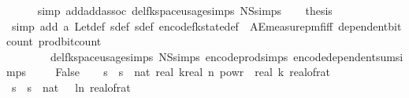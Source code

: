 \begin{isabellebody}
\ \ \ \ \isamarkupfalse%
\ {\isacharparenleft}{\kern0pt}simp\ add{\isacharcolon}{\kern0pt}add{\isachardot}{\kern0pt}assoc\ del{\isacharcolon}{\kern0pt}fk{\isacharunderscore}{\kern0pt}space{\isacharunderscore}{\kern0pt}usage{\isachardot}{\kern0pt}simps\ N\isactrlsub S{\isachardot}{\kern0pt}simps{\isacharparenright}{\kern0pt}\isanewline
\ \ \isamarkupfalse%
\ {\isacharquery}{\kern0pt}thesis\ \isanewline
\ \ \ \ \isamarkupfalse%
\ {\isacharparenleft}{\kern0pt}simp\ add{\isacharcolon}{\kern0pt}\ a\ Let{\isacharunderscore}{\kern0pt}def\ sdef\ sdef\ encode{\isacharunderscore}{\kern0pt}fk{\isacharunderscore}{\kern0pt}state{\isacharunderscore}{\kern0pt}def\ \ AE{\isacharunderscore}{\kern0pt}measure{\isacharunderscore}{\kern0pt}pmf{\isacharunderscore}{\kern0pt}iff\ dependent{\isacharunderscore}{\kern0pt}bit{\isacharunderscore}{\kern0pt}count\ prod{\isacharunderscore}{\kern0pt}bit{\isacharunderscore}{\kern0pt}count\isanewline
\ \ \ \ \ \ \ \ del{\isacharcolon}{\kern0pt}fk{\isacharunderscore}{\kern0pt}space{\isacharunderscore}{\kern0pt}usage{\isachardot}{\kern0pt}simps\ N\isactrlsub S{\isachardot}{\kern0pt}simps\ encode{\isacharunderscore}{\kern0pt}prod{\isachardot}{\kern0pt}simps\ encode{\isacharunderscore}{\kern0pt}dependent{\isacharunderscore}{\kern0pt}sum{\isachardot}{\kern0pt}simps{\isacharparenright}{\kern0pt}\ \isanewline
{}\isamarkupfalse%
\isanewline
\ \ \isamarkupfalse%
\ False\isanewline
\ \ \isamarkupfalse%
\ s\ \ {\isachardoublequoteopen}s\ {\isacharequal}{\kern0pt}\ nat\ {\isasymlceil}{}{\isacharasterisk}{\kern0pt}real\ k{\isacharasterisk}{\kern0pt}{\isacharparenleft}{\kern0pt}real\ n{\isacharparenright}{\kern0pt}\ powr\ {\isacharparenleft}{\kern0pt}{}{\isacharminus}{\kern0pt}{}{\isacharslash}{\kern0pt}\ real\ k{\isacharparenright}{\kern0pt}{\isacharslash}{\kern0pt}\ {\isacharparenleft}{\kern0pt}real{\isacharunderscore}{\kern0pt}of{\isacharunderscore}{\kern0pt}rat\ {\isasymdelta}{\isacharparenright}{\kern0pt}\isanewline
\ \ \isamarkupfalse%
\ s\ \ {\isachardoublequoteopen}s\ {\isacharequal}{\kern0pt}\ nat\ {\isasymlceil}{\isacharminus}{\kern0pt}{\isacharparenleft}{\kern0pt}{}{}\ {\isacharasterisk}{\kern0pt}\ ln\ {\isacharparenleft}{\kern0pt}real{\isacharunderscore}{\kern0pt}of{\isacharunderscore}{\kern0pt}rat\ {\isasymepsilon}{\isacharparenright}{\kern0pt}{\isacharparenright}{\kern0pt}{\isasymrceil}{\isachardoublequoteclose}\isanewline

\end{isabellebody}
